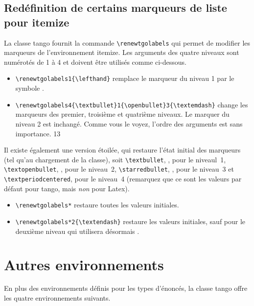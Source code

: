 \documentclass[french,ColorTheme=USAF,FontSize=10pt]{tango}
\newcommand\TO[1]{\textsf{#1}}
\begin{document}
\subsection{Redéfinition de certains marqueurs de liste pour itemize}
La classe tango fournit la commande  \verb+\renewtgolabels+ qui permet de modifier les marqueurs de l'environnement  \TO{itemize}. Les arguments des quatre niveaux sont numérotés de 1 à 4 et doivent être utilisés comme ci-dessous.

\begin{example}[Exemples]
\begin{itemize}
\item\verb=\renewtgolabels1{\lefthand}= remplace le marqueur du niveau 1 par le symbole \lefthand.
\item\verb=\renewtgolabels4{\textbullet}1{\openbullet}3{\textemdash}= change les marqueurs des premier, troisième et quatrième niveaux. Le marquer du niveau 2 est inchangé. Comme vous le voyez, l'ordre des arguments est sans importance. 1{\openbullet}3{\textemdash}
\end{itemize}
\end{example}

Il existe également une version étoilée, qui restaure l'état initial des marqueurs  (tel qu'au chargement de la classe), soit  \verb=\textbullet=, \textbullet, pour le niveaul~1, \verb=\textopenbullet=, \textopenbullet,  pour le niveau~2, \verb=\starredbullet=, \starredbullet, pour le niveau~3 et \verb=\textperiodcentered=, \textperiodcentered{} pour le niveau~4 (remarquez que ce sont les valeurs par défaut pour tango, mais \emph{non} pour Latex).

\renewtgolabels*
\begin{example}[Exemples]
\begin{itemize}
\item\verb=\renewtgolabels*= restaure toutes les valeurs initiales.
\item\verb=\renewtgolabels*2{\textendash}= restaure les valeurs initiales, sauf pour le deuxième niveau qui utilisera désormais \textendash.
\end{itemize}
\end{example}


\section{Autres environnements}
En plus des environnements définis pour les types d'énoncés, la classe tango offre les quatre environnements suivants.
\end{document}
